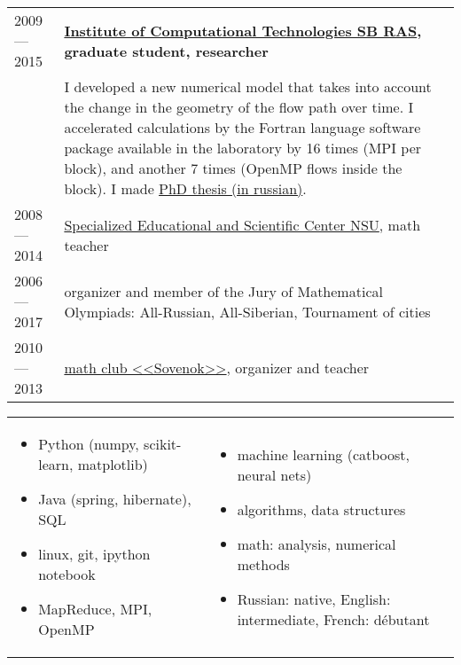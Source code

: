 \documentclass[11pt]{article}
\begin{document}
\begin{longtable} {l | p{}}
2009 — 2015 & {\textbf{\href{http://www.ict.nsc.ru}{Institute of Computational Technologies SB RAS}, graduate student, researcher}}\\

& {I developed a new numerical model that takes into account the change in the geometry of the flow path over time. I accelerated calculations by the Fortran language software package available in the laboratory by 16 times (MPI per block), and another 7 times (OpenMP flows inside the block). I made \href{https://github.com/avalur/dissertation/blob/master/to_print/autoref_Avdyushenko.pdf}{PhD thesis (in russian)}.} \\

2008 — 2014 & {\href{http://sesc.nsu.ru}{Specialized Educational and Scientific Center NSU}, math teacher}\\
2006 — 2017 & {organizer and member of the Jury of Mathematical Olympiads: All-Russian, All-Siberian, Tournament of cities}\\
2010 — 2013 & {\href{https://www.sovenok.academy/}{math club <<Sovenok>>}, organizer and teacher}\\

\end{longtable}

\vspace{-1em}
\begin{longtable} {p{}p{}}
\vspace{-2em}
\begin{itemize}
	\item Python (numpy, scikit-learn, matplotlib)
	\item Java (spring, hibernate), SQL
	\item linux, git, ipython notebook
	\item MapReduce, MPI, OpenMP
\end{itemize}
&
\vspace{-2em}
\begin{itemize}
	\item machine learning (catboost, neural nets)
	\item algorithms, data structures
	\item math: analysis, numerical methods
	\item Russian: native, English: intermediate, French: débutant
\end{itemize}
\\
\end{longtable}
\end{document}
